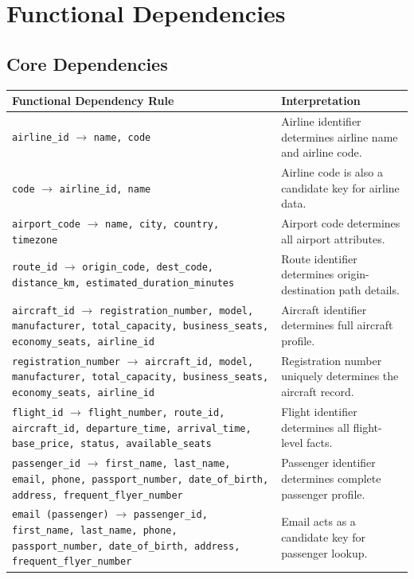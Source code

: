 \documentclass[12pt, a4paper]{article}
\begin{document}
\section{Functional Dependencies}

\subsection{Core Dependencies}
\footnotesize
\begin{longtable}{|p{}|p{}|}
\hline
\textbf{Functional Dependency Rule} & \textbf{Interpretation} \\
\hline
\texttt{airline\_id} $\rightarrow$ \texttt{name, code} & Airline identifier determines airline name and airline code. \\
\hline
\texttt{code} $\rightarrow$ \texttt{airline\_id, name} & Airline code is also a candidate key for airline data. \\
\hline
\texttt{airport\_code} $\rightarrow$ \texttt{name, city, country, timezone} & Airport code determines all airport attributes. \\
\hline
\texttt{route\_id} $\rightarrow$ \texttt{origin\_code, dest\_code, distance\_km, estimated\_duration\_minutes} & Route identifier determines origin-destination path details. \\
\hline
\texttt{aircraft\_id} $\rightarrow$ \texttt{registration\_number, model, manufacturer, total\_capacity, business\_seats, economy\_seats, airline\_id} & Aircraft identifier determines full aircraft profile. \\
\hline
\texttt{registration\_number} $\rightarrow$ \texttt{aircraft\_id, model, manufacturer, total\_capacity, business\_seats, economy\_seats, airline\_id} & Registration number uniquely determines the aircraft record. \\
\hline
\texttt{flight\_id} $\rightarrow$ \texttt{flight\_number, route\_id, aircraft\_id, departure\_time, arrival\_time, base\_price, status, available\_seats} & Flight identifier determines all flight-level facts. \\
\hline
\texttt{passenger\_id} $\rightarrow$ \texttt{first\_name, last\_name, email, phone, passport\_number, date\_of\_birth, address, frequent\_flyer\_number} & Passenger identifier determines complete passenger profile. \\
\hline
\texttt{email (passenger)} $\rightarrow$ \texttt{passenger\_id, first\_name, last\_name, phone, passport\_number, date\_of\_birth, address, frequent\_flyer\_number} & Email acts as a candidate key for passenger lookup. \\

\end{longtable}
\end{document}
